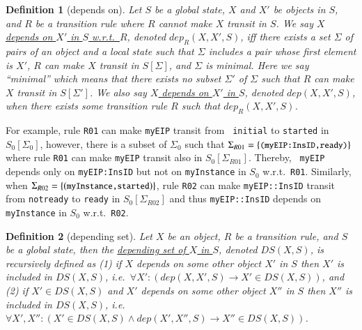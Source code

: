 \documentclass[12pt]{report}
\newtheorem{definition}{Definition}
\newcommand{\ra}{\rightarrow}
\newcommand{\mbstt}[1]{\mbox{\small{\tt {#1}}}}
\newcommand{\ul}{\underline}
\begin{document}
\begin{definition}[depends on]
Let $S$ be a global state, $X$ and $X'$ be objects in $S$, and $R$ be
a transition rule where $R$ cannot make $X$ transit in $S$.  We say
\ul{$X$ depends on $X'$ in $S$ w.r.t.\ $R$}, denoted \ul{$dep_R(X,
  X',S)$}, iff there exists a set $\Sigma$ of pairs of an object and a
local state such that $\Sigma$ includes a pair whose first element is
$X'$, $R$ can make $X$ transit in $S[\Sigma]$, and $\Sigma$ is
minimal.  Here we say ``minimal'' which means that there exists no
subset $\Sigma'$ of $\Sigma$ such that $R$ can make $X$ transit in
$S[\Sigma']$. We also say \ul{$X$ depends on $X'$ in $S$}, denoted
\ul{$dep(X, X',S)$}, when there exists some transition rule $R$ such
that $dep_R(X,X',S)$.
\end{definition}
For example, rule {\tt R01} can make {\tt myEIP} transit from {\tt
  initial} to {\tt started} in $S\!_0[\Sigma_0]$, however, there is a
subset of $\Sigma_0$ such that
$\Sigma_{R01}=\{\mbstt{(myEIP:InsID,ready)}\}$ where rule {\tt R01}
can make {\tt myEIP} transit also in $S\!_0[\Sigma_{R01}]$. Thereby, {\tt
  myEIP} depends only on {\tt myEIP:InsID} but not on {\tt myInstance}
in $S\!_0$ w.r.t.\ {\tt R01}. Similarly, when
$\Sigma_{R02}=\{(\mbstt{myInstance,started})\}$, rule {\tt R02} can
make {\tt myEIP::InsID} transit from {\tt notready} to {\tt ready} in
$S\!_0[\Sigma_{R02}]$ and thus {\tt myEIP::InsID} depends on {\tt
  myInstance} in $S\!_0$ w.r.t.\ {\tt R02}.

\begin{definition}[depending set]
Let $X$ be an object, $R$ be a transition rule, and $S$ be a global
state, then the \ul{depending set of $X$ in $S$}, denoted
\ul{$DS(X,S)$}, is recursively defined as (1) if $X$ depends on some
other object $X'$ in $S$ then $X'$ is included in
$DS(X,S)$, i.e.\ $\forall X': (dep(X,X',S) \ra X'\in DS(X,S))$, and
(2) if $X' \in DS(X,S)$ and $X'$ depends on some other object $X''$
in $S$ then $X''$ is included in $DS(X,S)$, i.e.\ $\forall
X',X'': (X'\in DS(X,S) \land dep(X',X'',S) \ra X''\in DS(X,S))$.
\end{definition}
\end{document}
